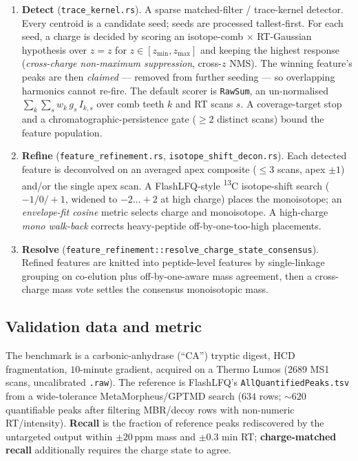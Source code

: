 \documentclass[11pt]{article}
\newcommand{\ppm}{\,\text{ppm}}
\newcommand{\Cthirteen}{\textsuperscript{13}C}
\newcommand{\zeq}[1]{\ensuremath{z{=}#1}}
\begin{document}
\begin{enumerate}[leftmargin=1.6em]
  \item \textbf{Detect} (\texttt{trace\_kernel.rs}). A sparse matched-filter / trace-kernel
  detector. Every centroid is a candidate seed; seeds are processed tallest-first. For each
  seed, a charge is decided by scoring an isotope-comb $\times$ RT-Gaussian hypothesis over
  \zeq{z} for $z \in [z_{\min}, z_{\max}]$ and keeping the highest response (\emph{cross-charge
  non-maximum suppression}, cross-$z$ NMS). The winning feature's peaks are then \emph{claimed}
  --- removed from further seeding --- so overlapping harmonics cannot re-fire. The default
  scorer is \texttt{RawSum}, an un-normalised $\sum_k \sum_s w_k\, g_s\, I_{k,s}$ over comb
  teeth $k$ and RT scans $s$. A coverage-target stop and a chromatographic-persistence gate
  ($\geq 2$ distinct scans) bound the feature population.
  \item \textbf{Refine} (\texttt{feature\_refinement.rs}, \texttt{isotope\_shift\_decon.rs}).
  Each detected feature is deconvolved on an averaged apex composite ($\leq 3$ scans, apex $\pm 1$)
  and/or the single apex scan. A FlashLFQ-style \Cthirteen{} isotope-shift search ($-1/0/+1$, widened
  to $-2\ldots+2$ at high charge) places the monoisotope; an \emph{envelope-fit cosine} metric
  selects charge and monoisotope. A high-charge \emph{mono walk-back} corrects heavy-peptide
  off-by-one-too-high placements.
  \item \textbf{Resolve} (\texttt{feature\_refinement::resolve\_charge\_state\_consensus}).
  Refined features are knitted into peptide-level features by single-linkage grouping on
  co-elution plus off-by-one-aware mass agreement, then a cross-charge mass vote settles the
  consensus monoisotopic mass.
\end{enumerate}

\subsection{Validation data and metric}
\label{sec:validation-data}
The benchmark is a carbonic-anhydrase (``CA'') tryptic digest, HCD fragmentation, $10$-minute
gradient, acquired on a Thermo Lumos (\num{2689} MS1 scans, uncalibrated \texttt{.raw}). The
reference is FlashLFQ's \texttt{AllQuantifiedPeaks.tsv} from a wide-tolerance
MetaMorpheus/GPTMD search ($634$ rows; $\sim620$ quantifiable peaks after filtering MBR/decoy
rows with non-numeric RT/intensity). \textbf{Recall} is the fraction of reference peaks
rediscovered by the untargeted output within $\pm 20\ppm$ mass and $\pm 0.3$ min RT;
\textbf{charge-matched recall} additionally requires the charge state to agree.
\end{document}
